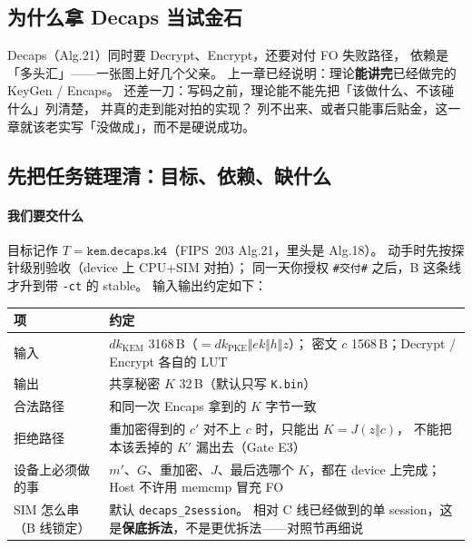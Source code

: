 \documentclass[UTF8,a4paper,11pt]{ctexart}
\theoremstyle{definition}
\theoremstyle{plain}
\theoremstyle{remark}
\numberwithin{figure}{section}
\numberwithin{table}{section}
\begin{document}
\subsection{为什么拿 Decaps 当试金石}
\label{sec:forward-why}

Decaps（Alg.21）同时要 Decrypt、Encrypt，还要对付 FO 失败路径，
依赖是「多头汇」——一张图上好几个父亲。
上一章已经说明：理论\textbf{能讲完}已经做完的 KeyGen / Encaps。
还差一刀：写码之前，理论能不能先把「该做什么、不该碰什么」列清楚，
并真的走到能对拍的实现？
列不出来、或者只能事后贴金，这一章就该老实写「没做成」，而不是硬说成功。

\subsection{先把任务链理清：目标、依赖、缺什么}
\label{sec:forward-chain}

\paragraph{我们要交什么}
目标记作 $T=\texttt{kem.decaps.k4}$（FIPS~203 Alg.21，里头是 Alg.18）。
动手时先按探针级别验收（device 上 CPU+SIM 对拍）；
同一天你授权 \texttt{\#交付\#} 之后，B 这条线才升到带 \texttt{-ct} 的 stable。
输入输出约定如下：
\begin{center}
\small
\begin{tabular}{@{}L{3.2cm}L{10.6cm}@{}}
  \toprule
  项 & 约定 \\
  \midrule
  输入 &
  $\mathit{dk}_{\mathrm{KEM}}$ 3168\,B（$=\mathit{dk}_{\mathrm{PKE}}\Vert\mathit{ek}\Vert h\Vert z$）；
  密文 $c$ 1568\,B；Decrypt / Encrypt 各自的 LUT \\
  输出 &
  共享秘密 $K$ 32\,B（默认只写 \texttt{K.bin}） \\
  合法路径 &
  和同一次 Encaps 拿到的 $K$ 字节一致 \\
  拒绝路径 &
  重加密得到的 $c'$ 对不上 $c$ 时，只能出 $K=J(z\Vert c)$，
  不能把本该丢掉的 $K'$ 漏出去（Gate E3） \\
  设备上必须做的事 &
  $m'$、$G$、重加密、$J$、最后选哪个 $K$，都在 device 上完成；
  Host 不许用 memcmp 冒充 FO \\
  SIM 怎么串（B 线锁定） &
  默认 \texttt{decaps\_2session}。
  相对 C 线已经做到的单 session，这是\textbf{保底拆法}，不是更优拆法——对照节再细说 \\
  \bottomrule
\end{tabular}
\end{center}
\end{document}
